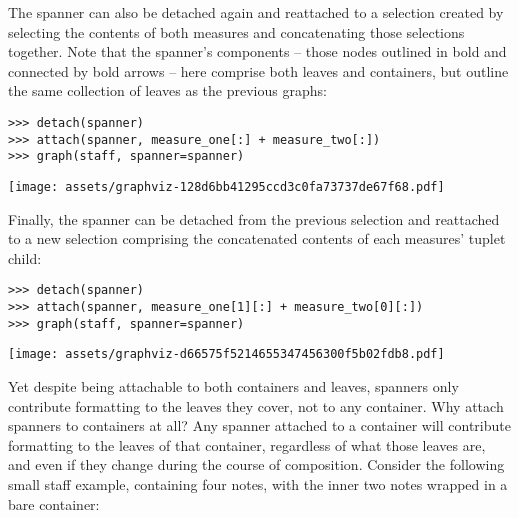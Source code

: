 \noindent The spanner can also be detached again and reattached to a selection
created by selecting the contents of both measures and concatenating those
selections together. Note that the spanner's components -- those nodes outlined
in bold and connected by bold arrows -- here comprise both leaves and
containers, but outline the same collection of leaves as the previous graphs:

\begin{comment}
<abjad>
detach(spanner)
attach(spanner, measure_one[:] + measure_two[:])
graph(staff, spanner=spanner)
</abjad>
\end{comment}

\begin{abjadbookoutput}
\begin{singlespacing}
\vspace{-0.5\baselineskip}
\begin{verbatim}
>>> detach(spanner)
>>> attach(spanner, measure_one[:] + measure_two[:])
>>> graph(staff, spanner=spanner)
\end{verbatim}
\noindent\texttt{[image: assets/graphviz-128d6bb41295ccd3c0fa73737de67f68.pdf]}
\end{singlespacing}
\end{abjadbookoutput}

\noindent Finally, the spanner can be detached from the previous selection and
reattached to a new selection comprising the concatenated contents of each
measures' tuplet child:

\begin{comment}
<abjad>
detach(spanner)
attach(spanner, measure_one[1][:] + measure_two[0][:])
graph(staff, spanner=spanner)
</abjad>
\end{comment}

\begin{abjadbookoutput}
\begin{singlespacing}
\vspace{-0.5\baselineskip}
\begin{verbatim}
>>> detach(spanner)
>>> attach(spanner, measure_one[1][:] + measure_two[0][:])
>>> graph(staff, spanner=spanner)
\end{verbatim}
\noindent\texttt{[image: assets/graphviz-d66575f5214655347456300f5b02fdb8.pdf]}
\end{singlespacing}
\end{abjadbookoutput}

\noindent Yet despite being attachable to both containers and leaves, spanners
only contribute formatting to the leaves they cover, not to any container. Why
attach spanners to containers at all? Any spanner attached to a container will
contribute formatting to the leaves of that container, regardless of what those
leaves are, and even if they change during the course of composition. Consider
the following small staff example, containing four notes, with the inner two
notes wrapped in a bare container:

